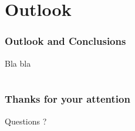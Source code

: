 \documentclass[ignorenonframetext]{beamer}
\begin{document}
\section{Outlook}
\begin{frame}
\frametitle{Outlook and Conclusions}
\begin{center}
Bla bla
\end{center}
\end{frame}








\section{}
\begin{frame}
\frametitle{Thanks for your attention}
\begin{center}
Questions ?
\end{center}
\end{frame}
\end{document}
